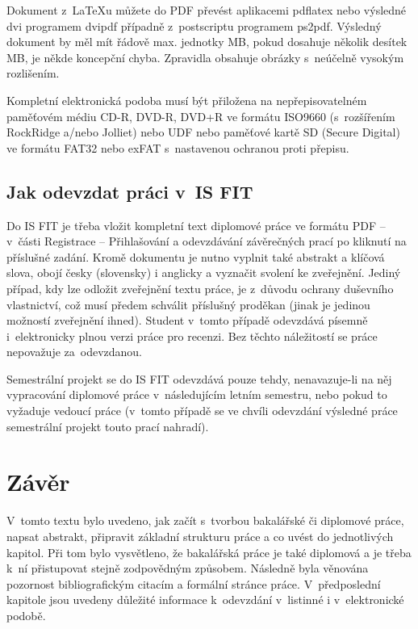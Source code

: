 Dokument z~\LaTeX{}u můžete do PDF převést aplikacemi pdflatex nebo výsledné dvi programem dvipdf případně z~postscriptu programem ps2pdf. Výsledný dokument by měl mít řádově max. jednotky MB, pokud dosahuje několik desítek MB, je někde koncepční chyba. Zpravidla obsahuje obrázky s~neúčelně vysokým rozlišením.

Kompletní elektronická podoba musí být přiložena na nepřepisovatelném paměťovém médiu CD-R, DVD-R, DVD+R ve formátu ISO9660 (s~rozšířením RockRidge a/nebo Jolliet) nebo UDF nebo paměťové kartě SD (Secure Digital) ve formátu FAT32 nebo exFAT s~nastavenou ochranou proti přepisu. 

\section{Jak odevzdat práci v~IS FIT}

Do IS FIT je třeba vložit kompletní text diplomové práce ve formátu PDF -- v~části Registrace -- Přihlašování a odevzdávání závěrečných prací po kliknutí na příslušné zadání. Kromě dokumentu je nutno vyplnit také abstrakt a klíčová slova, obojí česky (slovensky) i anglicky a vyznačit svolení ke zveřejnění. Jediný případ, kdy lze odložit zveřejnění textu práce, je z~důvodu ochrany duševního vlastnictví, což musí předem schválit příslušný proděkan (jinak je jedinou možností zveřejnění ihned). Student v~tomto případě odevzdává písemně i~elektronicky plnou verzi práce pro recenzi. Bez těchto náležitostí se práce nepovažuje za~odevzdanou. 

Semestrální projekt se do IS FIT odevzdává pouze tehdy, nenavazuje-li na něj vypracování diplomové práce v~následujícím letním semestru, nebo pokud to vyžaduje vedoucí práce (v~tomto případě se ve chvíli odevzdání výsledné práce semestrální projekt touto prací nahradí). 


\chapter{Závěr}
\label{zaver}

V~tomto textu bylo uvedeno, jak začít s~tvorbou bakalářské či diplomové práce, napsat abstrakt, připravit základní strukturu práce a co uvést do jednotlivých kapitol. Při tom bylo vysvětleno, že bakalářská práce je také diplomová a je třeba k~ní přistupovat stejně zodpovědným způsobem. Následně byla věnována pozornost bibliografickým citacím a formální stránce práce. V~předposlední kapitole jsou uvedeny důležité informace k~odevzdání v~listinné i v~elektronické podobě.

